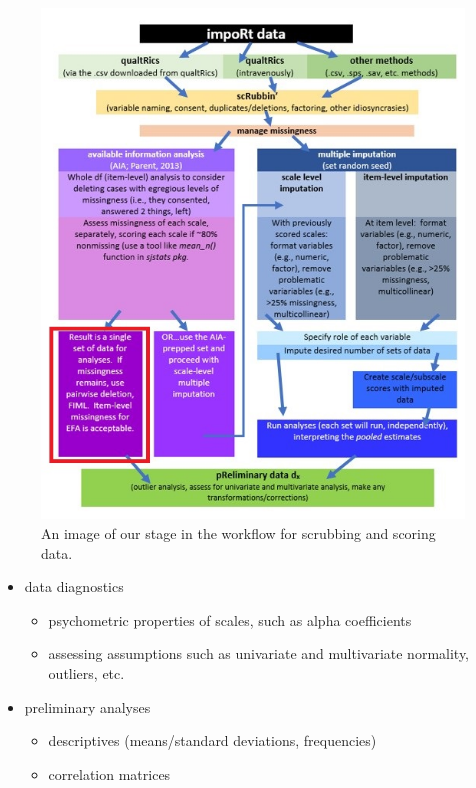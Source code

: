 \documentclass[
  11pt,
]{book}
\providecommand{\tightlist}{%
  \setlength{\itemsep}{0pt}\setlength{\parskip}{0pt}}
\begin{document}
\begin{figure}
\centering
\includegraphics{images/Ch02/wrkflow_AIAready.jpg}
\caption{An image of our stage in the workflow for scrubbing and scoring data.}
\end{figure}

\begin{itemize}
\tightlist
\item
  data diagnostics

  \begin{itemize}
  \tightlist
  \item
    psychometric properties of scales, such as alpha coefficients
  \item
    assessing assumptions such as univariate and multivariate normality, outliers, etc.
  \end{itemize}
\item
  preliminary analyses

  \begin{itemize}
  \tightlist
  \item
    descriptives (means/standard deviations, frequencies)
  \item
    correlation matrices
  \end{itemize}
\end{itemize}
\end{document}
